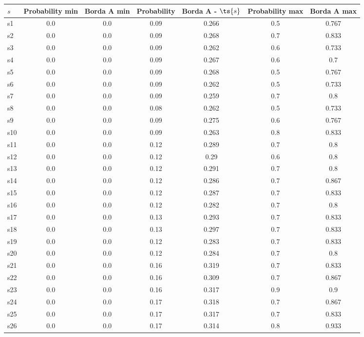 \documentclass{article}
\begin{document}
\noindent\begin{tabular}{|l|c|c|c|c|c|c|}
\hline
$s$& Probability min & Borda A min & Probability & Borda A - $\ts{s}$ & Probability max & Borda A max\\
\hline
s1 &0.0 & 0.0 & 0.09 & 0.266 & 0.5 & 0.767\\
\hline
s2 &0.0 & 0.0 & 0.09 & 0.268 & 0.7 & 0.833\\
\hline
s3 &0.0 & 0.0 & 0.09 & 0.262 & 0.6 & 0.733\\
\hline
s4 &0.0 & 0.0 & 0.09 & 0.267 & 0.6 & 0.7\\
\hline
s5 &0.0 & 0.0 & 0.09 & 0.268 & 0.5 & 0.767\\
\hline
s6 &0.0 & 0.0 & 0.09 & 0.262 & 0.5 & 0.733\\
\hline
s7 &0.0 & 0.0 & 0.09 & 0.259 & 0.7 & 0.8\\
\hline
s8 &0.0 & 0.0 & 0.08 & 0.262 & 0.5 & 0.733\\
\hline
s9 &0.0 & 0.0 & 0.09 & 0.275 & 0.6 & 0.767\\
\hline
s10 &0.0 & 0.0 & 0.09 & 0.263 & 0.8 & 0.833\\
\hline
s11 &0.0 & 0.0 & 0.12 & 0.289 & 0.7 & 0.8\\
\hline
s12 &0.0 & 0.0 & 0.12 & 0.29 & 0.6 & 0.8\\
\hline
s13 &0.0 & 0.0 & 0.12 & 0.291 & 0.7 & 0.8\\
\hline
s14 &0.0 & 0.0 & 0.12 & 0.286 & 0.7 & 0.867\\
\hline
s15 &0.0 & 0.0 & 0.12 & 0.287 & 0.7 & 0.833\\
\hline
s16 &0.0 & 0.0 & 0.12 & 0.282 & 0.7 & 0.8\\
\hline
s17 &0.0 & 0.0 & 0.13 & 0.293 & 0.7 & 0.833\\
\hline
s18 &0.0 & 0.0 & 0.13 & 0.297 & 0.7 & 0.833\\
\hline
s19 &0.0 & 0.0 & 0.12 & 0.283 & 0.7 & 0.833\\
\hline
s20 &0.0 & 0.0 & 0.12 & 0.284 & 0.7 & 0.8\\
\hline
s21 &0.0 & 0.0 & 0.16 & 0.319 & 0.7 & 0.833\\
\hline
s22 &0.0 & 0.0 & 0.16 & 0.309 & 0.7 & 0.867\\
\hline
s23 &0.0 & 0.0 & 0.16 & 0.317 & 0.9 & 0.9\\
\hline
s24 &0.0 & 0.0 & 0.17 & 0.318 & 0.7 & 0.867\\
\hline
s25 &0.0 & 0.0 & 0.17 & 0.317 & 0.7 & 0.833\\
\hline
s26 &0.0 & 0.0 & 0.17 & 0.314 & 0.8 & 0.933\\

\end{tabular}
\end{document}
